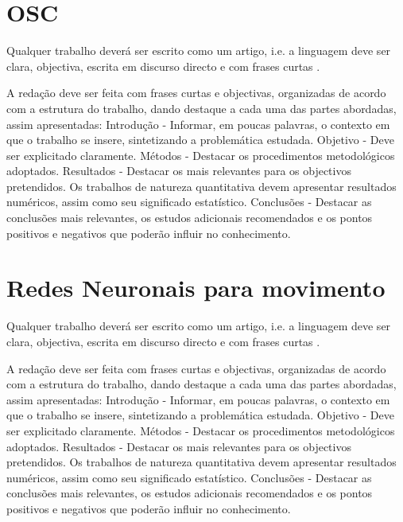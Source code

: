 \section{OSC}
Qualquer trabalho deverá ser escrito como um artigo, i.e. a linguagem deve ser clara, objectiva, escrita em discurso directo e com frases curtas \cite{gustavii2016write, glasman2010science}.

A redação deve ser feita com frases curtas e objectivas, organizadas de acordo com a estrutura do trabalho, dando destaque a cada uma das partes abordadas, assim apresentadas: Introdução - Informar, em poucas palavras, o contexto em que o trabalho se insere, sintetizando a problemática estudada. Objetivo - Deve ser explicitado claramente. Métodos - Destacar os procedimentos metodológicos adoptados. Resultados - Destacar os mais relevantes para os objectivos pretendidos. Os trabalhos de natureza quantitativa devem apresentar resultados numéricos, assim como seu significado estatístico. Conclusões - Destacar as conclusões mais relevantes, os estudos adicionais recomendados e os pontos positivos e negativos que poderão influir no conhecimento.


\section{Redes Neuronais para movimento}
Qualquer trabalho deverá ser escrito como um artigo, i.e. a linguagem deve ser clara, objectiva, escrita em discurso directo e com frases curtas \cite{gustavii2016write, glasman2010science}.

A redação deve ser feita com frases curtas e objectivas, organizadas de acordo com a estrutura do trabalho, dando destaque a cada uma das partes abordadas, assim apresentadas: Introdução - Informar, em poucas palavras, o contexto em que o trabalho se insere, sintetizando a problemática estudada. Objetivo - Deve ser explicitado claramente. Métodos - Destacar os procedimentos metodológicos adoptados. Resultados - Destacar os mais relevantes para os objectivos pretendidos. Os trabalhos de natureza quantitativa devem apresentar resultados numéricos, assim como seu significado estatístico. Conclusões - Destacar as conclusões mais relevantes, os estudos adicionais recomendados e os pontos positivos e negativos que poderão influir no conhecimento.

